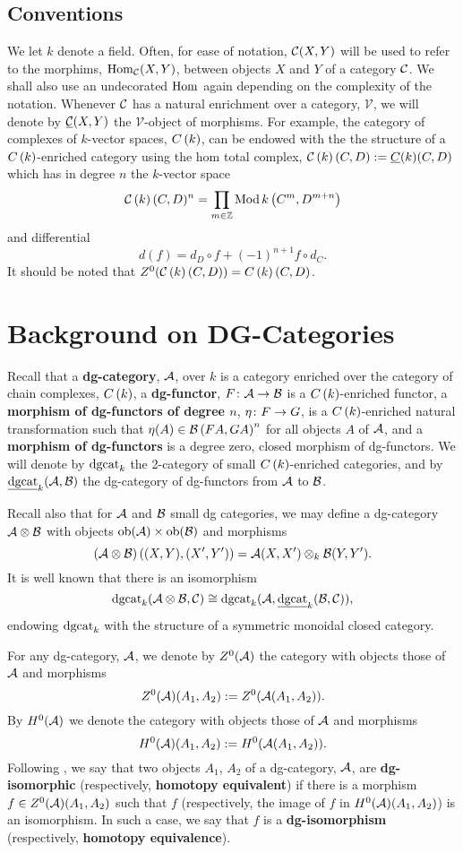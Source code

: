 \documentclass[dissertation.tex]{subfiles}
\begin{document}
\subsection{Conventions} We let \(k\) denote a field.
Often, for ease of notation, \(\mathcal{C}(X,Y)\) will be used to refer to the morphims, \(\operatorname{Hom}_{\mathcal{C}}(X,Y)\), between objects \(X\) and \(Y\) of a category \(\mathcal{C}\). We shall also use an undecorated \(\operatorname{Hom}\) again depending on the complexity of the notation. 
Whenever \(\mathcal{C}\) has a natural enrichment over a category, \(\mathcal{V}\), we will denote by \(\underline{\mathcal{C}}(X,Y)\) the \(\mathcal{V}\)-object of morphisms.
For example, the category of complexes of \(k\)-vector spaces, \(C\left(k\right)\), can be endowed with the the structure of a \(C\left(k\right)\)-enriched category using the hom total complex, \(\mathcal{C}\left(k\right)(C,D) := \underline{C}(k)(C,D)\) which has in degree \(n\) the \(k\)-vector space
\[\mathcal{C}\left(k\right)(C,D)^n = \prod_{m \in \mathbb{Z}}\operatorname{Mod}k\left(C^m, D^{m + n}\right)\]
and differential
\[d(f) = d_D \circ f + (-1)^{n+1} f \circ d_C.\]
It should be noted that \(Z^0(\mathcal{C}\left(k\right)(C,D)) = C\left(k\right)(C,D)\).

\section{Background on DG-Categories}\label{section:background on dgcats}
Recall that a {\bf dg-category}, \(\mathcal{A}\), over \(k\) is a category enriched over the category of chain complexes, \(C\left(k\right)\), a {\bf dg-functor}, \(F \colon \mathcal{A} \rightarrow \mathcal{B}\) is a \(C\left(k\right)\)-enriched functor, a {\bf morphism of dg-functors of degree \(n\)}, \(\eta \colon F \rightarrow G\), is a \(C\left(k\right)\)-enriched natural transformation such that \(\eta(A) \in \mathcal{B}\left(FA, GA\right)^n\) for all objects \(A\) of \(\mathcal {\mathcal{A}}\), and a {\bf morphism of dg-functors} is a degree zero, closed morphism of dg-functors.
We will denote by \(\operatorname{dgcat}_k\) the 2-category of small \(C\left(k\right)\)-enriched categories, and by \(\underline{\operatorname{dgcat}}_{k}(\mathcal{A},\mathcal{B})\) the dg-category of dg-functors from \(\mathcal{A}\) to \(\mathcal{B}\).

Recall also that for \(\mathcal{A}\) and \(\mathcal{B}\) small dg categories, we may define a dg-category \(\mathcal{A} \otimes \mathcal{B}\) with objects \(\operatorname{ob}(\mathcal{A}) \times \operatorname{ob}(\mathcal{B})\) and morphisms
\[(\mathcal{A} \otimes \mathcal{B})\left((X,Y), (X^\prime,Y^\prime)\right) = \mathcal{A}(X,X^\prime) \otimes_k \mathcal{B}(Y, Y^\prime).\]
It is well known that there is an isomorphism
\[\operatorname{dgcat}_k(\mathcal{A} \otimes \mathcal{B}, \mathcal{C}) \cong \operatorname{dgcat}_k(\mathcal{A}, \underline{\operatorname{dgcat}}_{k}(\mathcal{B}, \mathcal{C})),\]
endowing \(\operatorname{dgcat}_k\) with the structure of a symmetric monoidal closed category.

For any dg-category, \(\mathcal{A}\), we denote by \(Z^0(\mathcal{A})\) the category with objects those of \(\mathcal{A}\) and morphisms
\[Z^0(\mathcal{A})(A_1, A_2) := Z^0(\mathcal{A}(A_1,A_2)).\]
By \(H^0(\mathcal{A})\) we denote the category with objects those of \(\mathcal{A}\) and morphisms
\[H^0(\mathcal{A})(A_1, A_2) := H^0(\mathcal{A}(A_1,A_2)).\]
Following \cite{CS}, we say that two objects \(A_1\), \(A_2\) of a dg-category, \(\mathcal{A}\), are {\bf dg-isomorphic} (respectively, {\bf homotopy equivalent}) if there is a morphism \(f \in Z^0(\mathcal{A})(A_1, A_2)\) such that \(f\) (respectively, the image of \(f\) in \(H^0(\mathcal{A})(A_1, A_2)\)) is an isomorphism.
In such a case, we say that \(f\) is a {\bf dg-isomorphism} (respectively, {\bf homotopy equivalence}).
\end{document}
